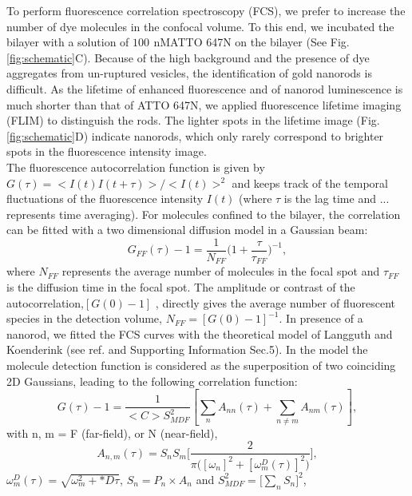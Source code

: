 \documentclass[journal=jpccck,manuscript=article]{achemso}
\newcommand{\nM}{\ensuremath{\,\textrm{nM}}}
\begin{document}
To perform fluorescence correlation spectroscopy (FCS), we prefer to increase the number of dye molecules in the 
confocal volume. To this end, we incubated the bilayer with a solution of $100~$\nM ATTO 647N on the 
bilayer (See Fig. \ref{fig:schematic}C). Because of the high background and the presence of dye aggregates 
from un-ruptured vesicles, the identification of gold nanorods is difficult. As the lifetime of enhanced fluorescence 
and of nanorod luminescence is much shorter than that of ATTO 647N, we applied fluorescence lifetime 
imaging (FLIM) to distinguish the rods. The lighter spots in the lifetime image (Fig.\ref{fig:schematic}D) indicate 
nanorods, which only rarely correspond to brighter spots in the fluorescence intensity image.\\
The fluorescence autocorrelation function is given by $G(\tau)=<I(t)I(t+\tau)>/<I(t)>^2$ and keeps
track of the temporal fluctuations of the fluorescence intensity $I(t)$ (where $\tau$ is the lag time and
... represents time averaging). For molecules confined to the bilayer, the correlation can be fitted with a two 
dimensional diffusion model in a Gaussian beam:
\begin{equation}
	G_{FF}(\tau)-1 = \frac{1}{N_{FF}}\bigg(1+\frac{\tau}{\tau_{FF}} \bigg)^{-1},
	\label{eq:2D-gauss-diffusion}
\end{equation}
where $N_{FF}$ represents the average number of molecules in the focal spot and $\tau_{FF}$ is the diffusion 
time in the focal spot. The amplitude or contrast of the autocorrelation,$[G(0)-1]$ , directly gives the average 
number of fluorescent species in the detection volume, $N_{FF}=[G(0)-1]^{-1}$. In presence of a nanorod, we fitted 
the FCS curves with the theoretical model of Langguth and Koenderink (see ref.\cite{langguth2014simple} and 
Supporting Information Sec.5). In the model the molecule detection function is considered as the superposition of 
two coinciding 2D Gaussians, leading to the following correlation function:
\begin{equation}
	G(\tau)-1 = \frac{1}{<C>S_{MDF}^2}[\sum_{n}A_{nn}(\tau) + \sum_{n\neq m}A_{nm}(\tau)],
	\label{eqm:far-near-gauss}
\end{equation}
with n, m = F (far-field), or N (near-field),
\begin{equation}
	A_{n,m}(\tau)=S_nS_m\Bigg[\frac{2}{\pi\Big([\omega_n]^2 + [\omega_m^D(\tau)]^2 \Big)}\Bigg] ,
	\label{eqm:area-gauss}
\end{equation}
$\omega_m^D(\tau)=\sqrt{\omega_m^2 + *D\tau}$, $S_n=P_n\times A_n$ and $S_{MDF}^2=\Big[\sum_{n}S_n\Big]^2$,\\
\end{document}
